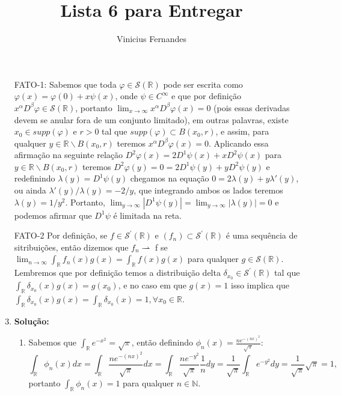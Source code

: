 \documentclass{article}
\begin{document}
	
	\title{Lista 6 para Entregar}
	\author{Vinicius Fernandes}
	
	\maketitle
	
	\begin{enumerate}
		\item[FATO-1:] 	Sabemos que toda $\varphi \in \mathcal{S}(\mathbb{R})$ pode ser escrita como $\varphi(x) = \varphi(0) + x \psi(x)$, onde $\psi \in C^{\infty}$ e que por definição $x^{\alpha}D^{\beta}\varphi \in \mathcal{S}(\mathbb{R})$, portanto $\lim_{x \to \infty} x^{\alpha}D^{\beta}\varphi(x) = 0$ (pois essas derivadas devem se anular fora de um conjunto limitado), em outras palavras, existe $x_{0} \in supp(\varphi)$ e $r >0$ tal que $supp(\varphi) \subset B(x_{0}, r)$, e assim, para qualquer $y \in \mathbb{R} \backslash B(x_{0}, r)$ teremos $x^{\alpha}D^{\beta}\varphi(x) = 0$. Aplicando essa afirmação na seguinte relação $D^{2}\varphi(x) = 2D^{1}\psi(x) + x D^{2}\psi(x)$  para $y \in \mathbb{R} \backslash B(x_{0}, r)$ teremos $D^{2}\varphi(y)=0 = 2D^{1}\psi(y) + y D^{2}\psi(y)$ e redefinindo $\lambda(y) = D^{1}\psi(y)$ chegamos na equação $0 = 2\lambda(y)+y\lambda'(y)$, ou ainda $\lambda'(y)/\lambda(y) = -2/y$, que integrando ambos os lados teremos $\lambda(y) = 1/y^{2}$. Portanto, $\lim_{y \to \infty} |D^{1}\psi(y)| = \lim_{y \to \infty} |\lambda(y)| = 0$ e podemos afirmar que $D^{1}\psi$ é limitada na reta.
		
		\item[FATO-2] Por definição, se $f \in \mathcal{S}^{'}(\mathbb{R})$ e $(f_{n}) \subset \mathcal{S}^{'}(\mathbb{R})$ é uma sequência de sitribuições, então dizemos que $f_{n} \rightharpoonup$ f se $\lim_{n \to \infty} \int_{\mathbb{R}}f_{n}(x)g(x) = \int_{\mathbb{R}}f(x)g(x)$ para qualquer $g \in \mathcal{S}(\mathbb{R})$. Lembremos que por definição temos a distribuição delta $\delta_{x_{0}} \in \mathcal{S}^{'}(\mathbb{R})$ tal que $\int_{\mathbb{R}}\delta_{x_0}(x)g(x) = g(x_{0})$, e no caso em que $g(x) = 1$ isso implica que $\int_{\mathbb{R}}\delta_{x_0}(x)g(x) = \int_{\mathbb{R}}\delta_{x_0}(x) = 1, \forall x_{0} \in \mathbb{R}$.
			
		\item \textbf{Solução:} 
			\begin{enumerate}
				\item Sabemos que $\int_{\mathbb{R}} e^{-x^{2}} = \sqrt{\pi}$, então definindo $\phi_{n}(x) = \frac{ne^{-(nx)^{2}}}{\sqrt{\pi}}$:
				$$
				\int_{\mathbb{R}}\phi_{n}(x)dx= 				\int_{\mathbb{R}} \frac{ne^{-(nx)^{2}}}{\sqrt{\pi}} dx = \int_{\mathbb{R}} \frac{ne^{-y^{2}}}{\sqrt{\pi}} \frac{1}{n} dy = \frac{1}{\sqrt{\pi}} \int_{\mathbb{R}} e^{-y^{2}} dy = \frac{1}{\sqrt{\pi}}  \sqrt{\pi} = 1,
				$$
				portanto $\int_{\mathbb{R}}\phi_{n}(x) = 1$ para qualquer $n \in \mathbb{N}$.
				

\end{enumerate}
\end{enumerate}
\end{document}
